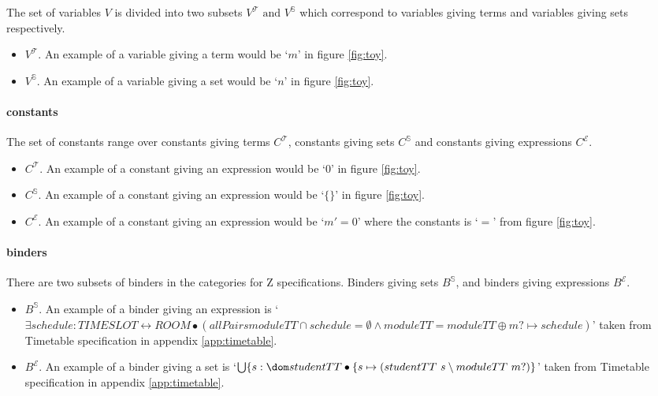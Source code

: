 The set of variables $V$ is divided into two subsets $V^{\mathcal{T}}\text{ and } V^{\mathbb{S}}$ which correspond to variables giving terms and variables giving sets respectively.

\begin{itemize}
\item $V^{\mathcal{T}}$. An example of a variable giving a term would be `$m$' in figure \ref{fig:toy}.

\item $V^{\mathbb{S}}$. An example of a variable giving a set would be `$n$' in figure \ref{fig:toy}.
\end{itemize}

\paragraph{constants}
\label{subsubsec:costants}

The set of constants range over constants giving terms $C^{\mathcal{T}}$, constants giving sets $C^{\mathbb{S}}$ and constants giving expressions $C^{\mathcal{E}}$.

\begin{itemize} 
\item $C^{\mathcal{T}}$. An example of a constant giving an expression would be `$0$' in figure \ref{fig:toy}.

\item $C^{\mathbb{S}}$. An example of a constant giving an expression would be `$\{\}$' in figure \ref{fig:toy}.

\item $C^{\mathcal{E}}$. An example of a constant giving an expression would be `$m' = 0$' where the constants is `$=$' from figure \ref{fig:toy}.
\end{itemize}

\paragraph{binders}
\label{subsubsec:binders}

There are two subsets of binders in the categories for Z specifications. Binders giving sets $B^{\mathbb{S}}$, and binders giving expressions $B^{\mathcal{E}}$.

\begin{itemize}
\item $B^{\mathbb{S}}$. An example of a binder giving an expression is 
\newline
\noindent `$\exists schedule:TIMESLOT \leftrightarrow ROOM \bullet (allPairs moduleTT \cap schedule = \emptyset
\land moduleTT = moduleTT \oplus {m? \mapsto schedule})$'
\newline
\noindent taken from Timetable specification in appendix \ref{app:timetable}.

\item $B^{\mathcal{E}}$. An example of a binder giving a set is
\newline
\noindent `$\bigcup \{s:\dom studentTT \bullet \{s \mapsto (studentTT~s \setminus moduleTT~m?)\}$' \newline
\noindent taken from Timetable specification in appendix \ref{app:timetable}.
\end{itemize}

